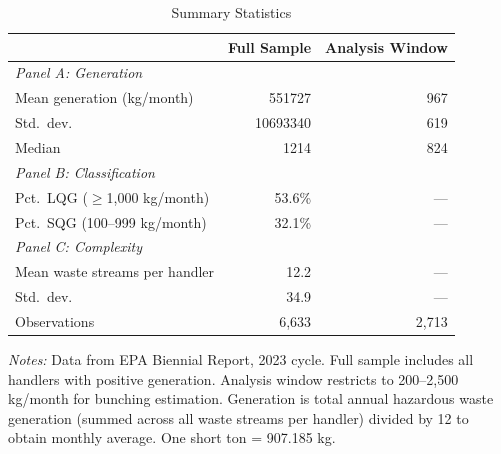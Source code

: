 
\begin{table}[H]
\centering
\caption{Summary Statistics}
\begin{threeparttable}
\begin{tabular}{lrr}
\toprule
& Full Sample & Analysis Window \\
\midrule
\textit{Panel A: Generation} & & \\
Mean generation (kg/month) & 551727 & 967 \\
Std.\ dev. & 10693340 & 619 \\
Median & 1214 & 824 \\
\midrule
\textit{Panel B: Classification} & & \\
Pct.\ LQG ($\geq$1,000 kg/month) & 53.6\% & --- \\
Pct.\ SQG (100--999 kg/month) & 32.1\% & --- \\
\midrule
\textit{Panel C: Complexity} & & \\
Mean waste streams per handler & 12.2 & --- \\
Std.\ dev. & 34.9 & --- \\
\midrule
Observations & 6,633 & 2,713 \\
\bottomrule
\end{tabular}
\begin{tablenotes}[flushleft]
\small
\item \textit{Notes:} Data from EPA Biennial Report, 2023 cycle. Full sample includes all handlers with positive generation. Analysis window restricts to 200--2,500 kg/month for bunching estimation. Generation is total annual hazardous waste generation (summed across all waste streams per handler) divided by 12 to obtain monthly average. One short ton = 907.185 kg.
\end{tablenotes}
\end{threeparttable}
\label{tab:summary}
\end{table}
